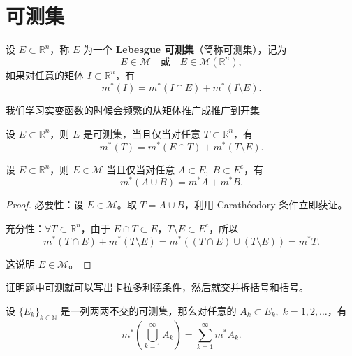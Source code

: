 \documentclass[lang=cn,10pt]{elegantbook}
\begin{document}
\section{可测集}
\begin{definition}[可测集]
设 $E \subset \mathbb{R}^n$，称 $E$ 为一个 \textbf{Lebesgue 可测集}（简称可测集），记为
\[
E \in \mathcal{M} \quad \text{或} \quad E \in \mathcal{M}(\mathbb{R}^n),
\]
如果对任意的矩体 $I \subset \mathbb{R}^n$，有
\[
m^*(I) = m^*(I \cap E) + m^*(I \setminus E).
\]
\end{definition}
我们学习实变函数的时候会频繁的从矩体推广成推广到开集
\begin{theorem}[Carathéodory 条件]
设 $E \subset \mathbb{R}^n$，则 $E$ 是可测集，当且仅当对任意 $T \subset \mathbb{R}^n$，有
\[
m^*(T) = m^*(E \cap T) + m^*(T \setminus E).
\]
\end{theorem}
\begin{theorem}[可测集的可加性]
设 $E \subset \mathbb{R}^n$，则 $E \in \mathcal{M}$ 当且仅当对任意 $A \subset E, \; B \subset E^c$，有
\[
m^*(A \cup B) = m^* A + m^* B.
\]
\end{theorem}

\begin{proof}
必要性：设 $E \in \mathcal{M}$。取 $T = A \cup B$，利用 Carathéodory 条件立即获证。

充分性：$\forall T \subset \mathbb{R}^n$，由于 $E \cap T \subset E$，$T \setminus E \subset E^c$，所以
\[
m^*(T \cap E) + m^*(T \setminus E) = m^*((T \cap E) \cup (T \setminus E)) = m^* T.
\]

这说明 $E \in \mathcal{M}$。
\end{proof}
证明题中可测就可以写出卡拉多利德条件，然后就交并拆括号和括号。
\begin{theorem}[测度的可列可加性]
设 $\{E_k\}_{k \in \mathbb{N}}$ 是一列两两不交的可测集，那么对任意的 $A_k \subset E_k, \; k = 1, 2, \dots$，有
\[
m^*\left( \bigcup_{k=1}^{\infty} A_k \right) = \sum_{k=1}^{\infty} m^* A_k.
\]
\end{theorem}
\end{document}
